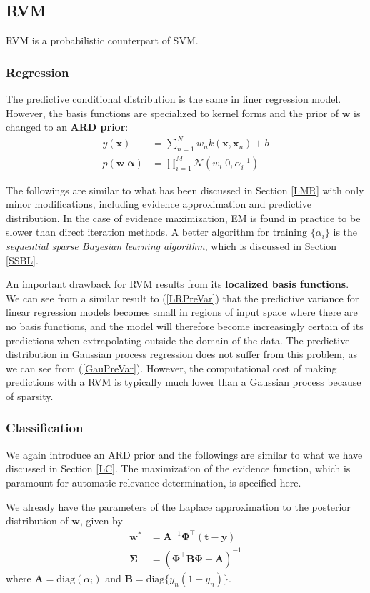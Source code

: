 \documentclass[a4paper]{book}
\newcommand{\up}{\mathrm}
\renewcommand{\bf}{\mathbf}
\renewcommand{\cal}{\mathcal}
\newcommand{\imp}[1]{\textit{#1}}
\newcommand{\bs}{\boldsymbol}
\begin{document}
\subsection{RVM}
RVM is a probabilistic counterpart of SVM. 
\subsubsection{Regression}
The predictive conditional distribution is the same in liner regression model. However, the basis functions are specialized to kernel forms and the prior of $\bf{w}$ is changed to an \textbf{ARD prior}:
\begin{align}
	y(\bf{x}) &= \sum_{n=1}^{N} w_n k(\bf{x},\bf{x}_n) + b\\
	p(\bf{w}|\bs{\alpha}) &= \prod_{i=1}^M \cal{N}(w_i |0,\alpha_i^{-1})
\end{align}

The followings are similar to what has been discussed in Section \ref{LMR} with only minor modifications, including evidence approximation and predictive distribution. In the case of evidence maximization, EM is found in practice to be slower than direct iteration methods. A better algorithm for training $\{ \alpha_i\}$ is the \imp{sequential sparse Bayesian learning algorithm}, which is discussed in Section \ref{SSBL}. 

An important drawback for RVM results from its \textbf{localized basis functions}. We can see from a similar result to (\ref{LRPreVar}) that the predictive variance for linear regression models becomes small in regions of input space where there are no basis functions, and the model will therefore become increasingly certain of its predictions when extrapolating outside the domain of the data. The predictive distribution in Gaussian process regression does not suffer from this problem, as we can see from (\ref{GauPreVar}). However, the computational cost of making predictions with a RVM is typically much lower than a Gaussian process because of sparsity.
\subsubsection{Classification}
We again introduce an ARD prior and the followings are similar to what we have discussed in Section \ref{LC}. The maximization of the evidence function, which is paramount for automatic relevance determination, is specified here.

We already have the parameters of the Laplace approximation to the posterior distribution of $\bf{w}$, given by
\begin{align}
	\bf{w}^* &= \bf{A}^{-1} \bs{\Phi}^{\intercal} (\bf{t-y}) \\
	\bs{\Sigma} &= (\bs{\Phi}^{\intercal} \bf{B} \bs{\Phi} + \bf{A})^{-1}
\end{align}
where $\bf{A} = \up{diag}(\alpha_i)$ and $\bf{B} = \up{diag}\{y_n(1-y_n)\}$. 
\end{document}
